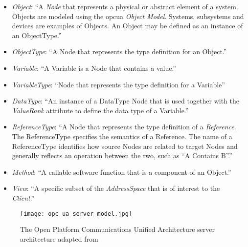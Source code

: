\documentclass[
a4paper,
twoside,
headsepline,
cleardoublepage=empty,
parskip=half,
draft=false
]{scrbook}
\begin{document}
				\begin{itemize}

					\item \textit{Object}: ``A \textit{Node} that represents a physical or abstract element of a system. Objects are modeled using the \gls{opcua} \textit{Object Model}. Systems, subsystems and devices are examples of Objects. An Object may be defined as an instance of an ObjectType.''~\cite{opcfoundation2017part1}

					\item \textit{ObjectType}: ``A Node that represents the type definition
					for an Object.''~\cite{opcfoundation2017part1}

					\item \textit{Variable}: ``A Variable is a Node that contains a value.''~\cite{opcfoundation2017part1}

					\item \textit{VariableType}: ``Node that represents the type definition for a Variable''~\cite{opcfoundation2018part3}

					\item \textit{DataType}: ``An instance of a DataType Node that is used together with the \textit{ValueRank} attribute to define the data type of a Variable.''~\cite{opcfoundation2018part3}

					\item \textit{ReferenceType}: ``A Node that represents the type definition of a \textit{Reference}. The ReferenceType specifies the semantics of a Reference. The name of a ReferenceType identifies how source Nodes are related to target Nodes and generally reflects an operation between the two, such as “A Contains B”.''~\cite{opcfoundation2017part1}

					\item \textit{Method}: ``A callable software function that is a component of an Object.''~\cite{opcfoundation2017part1}

					\item \textit{View}: ``A specific subset of the \textit{AddressSpace} that is of interest to the \textit{Client}.''~\cite{opcfoundation2017part1}

				\end{itemize}

				\begin{figure}[htbp]
					\centering
					\texttt{[image: opc\_ua\_server\_model.jpg]}
					\caption{The Open Platform Communications Unified Architecture server architecture adapted from~\cite{opcfoundation2017part1}}
					\label{fig:opc_ua_server_model}
				\end{figure}
\end{document}
